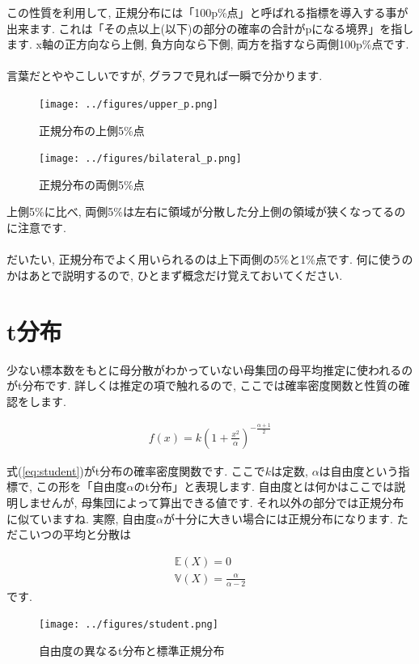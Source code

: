 \documentclass[11pt,a4paper,uplatex]{ujreport} 	%
\begin{document}
この性質を利用して, 正規分布には「100p\%点」と呼ばれる指標を導入する事が出来ます. これは「その点以上(以下)の部分の確率の合計がpになる境界」を指します. x軸の正方向なら上側, 負方向なら下側, 両方を指すなら両側100p\%点です. \\\\

言葉だとややこしいですが, グラフで見れば一瞬で分かります.


\begin{figure}[H]
\label{im:upper}
  \centering
  \texttt{[image: ../figures/upper\_p.png]}
  \caption{正規分布の上側5\%点}
\end{figure}

\begin{figure}[H]
\label{im:bilateral}
  \centering
  \texttt{[image: ../figures/bilateral\_p.png]}
  \caption{正規分布の両側5\%点}
\end{figure}

上側5\%に比べ, 両側5\%は左右に領域が分散した分上側の領域が狭くなってるのに注意です. \\
\\

だいたい, 正規分布でよく用いられるのは上下両側の5\%と1\%点です. 何に使うのかはあとで説明するので, ひとまず概念だけ覚えておいてください.

\section{t分布}
少ない標本数をもとに母分散がわかっていない母集団の母平均推定に使われるのがt分布です. 詳しくは推定の項で触れるので, ここでは確率密度関数と性質の確認をします.

\begin{align}
\label{eq:student}
f(x) = k(1 + \frac{x^2}{\alpha})^{-\frac{\alpha+1}{2}}
\end{align}

式(\ref{eq:student})がt分布の確率密度関数です. ここで$k$は定数, $\alpha$は自由度という指標で, この形を「自由度$\alpha$のt分布」と表現します. 自由度とは何かはここでは説明しませんが, 母集団によって算出できる値です. それ以外の部分では正規分布に似ていますね. 実際, 自由度$\alpha$が十分に大きい場合には正規分布になります. ただこいつの平均と分散は

\begin{align}
\mathbb{E}(X) = 0\\
\mathbb{V}(X) = \frac{\alpha}{\alpha-2}
\end{align}
です. 

\begin{figure}[H]
\label{im:student}
  \centering
  \texttt{[image: ../figures/student.png]}
  \caption{自由度の異なるt分布と標準正規分布}
\end{figure}
\end{document}
